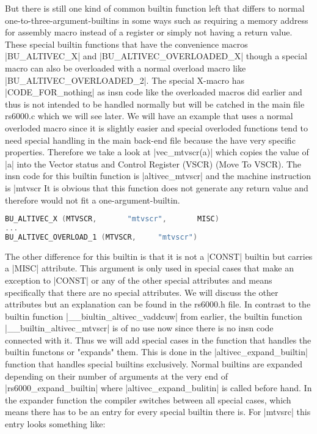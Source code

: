 But there is still one kind of common builtin function left that differs to normal one-to-three-argument-builtins in some ways such as requiring a memory address for assembly macro instead of a register or simply not having a return value. These special builtin functions that have the convenience macros |BU_ALTIVEC_X| and |BU_ALTIVEC_OVERLOADED_X| though a special macro can also be overloaded with a normal overload macro like |BU_ALTIVEC_OVERLOADED_2|.
The special X-macro has |CODE_FOR_nothing| as insn code like the overloaded macros did earlier and thus is not intended to be handled normally but will be catched in the main file rs6000.c which we will see later.
We will have an example that uses a normal overloded macro since it is slightly easier and special overloded functions tend to need special handling in the main back-end file because the have very specific properties. Therefore we take a look at |vec_mtvscr(a)| which copies the value of |a| into the Vector status and Control Register (VSCR) (Move To VSCR). The insn code for this builtin function is |altivec_mtvscr| and the machine instruction is |mtvscr %
It is obvious that this function does not generate any return value and therefore would not fit a one-argument-builtin.
\begin{lstlisting}[language=C++,basicstyle=\ttfamily\scriptsize,keywordstyle=\color{red}] 
BU_ALTIVEC_X (MTVSCR,		"mtvscr",	    MISC)
...
BU_ALTIVEC_OVERLOAD_1 (MTVSCR,	   "mtvscr")
\end{lstlisting}
The other difference for this builtin is that it is not a |CONST| builtin but carries a |MISC| attribute. This argument is only used in special cases that make an exception to |CONST| or any of the other special attributes and means specifically that there are no special attributes. We will discuss the other attributes but an explanation can be found in the rs6000.h file.
In contrast to the builtin function |__biultin_altivec_vaddcuw| from earlier, the builtin function |__builtin_altivec_mtvscr| is of no use now since there is no insn code connected with it. Thus we will add special cases in the function that handles the builtin functons or "expands" them. This is done in the |altivec_expand_builtin| function that handles special builtins exclusively. Normal builtins are expanded depending on their number of arguments at the very end of |rs6000_expand_builtin| where |altivec_expand_bulitin| is called before hand. 
In the expander function the compiler switches between all special cases, which means there has to be an entry for every special builtin there is. For |mtvsrc| this entry looks something like:
